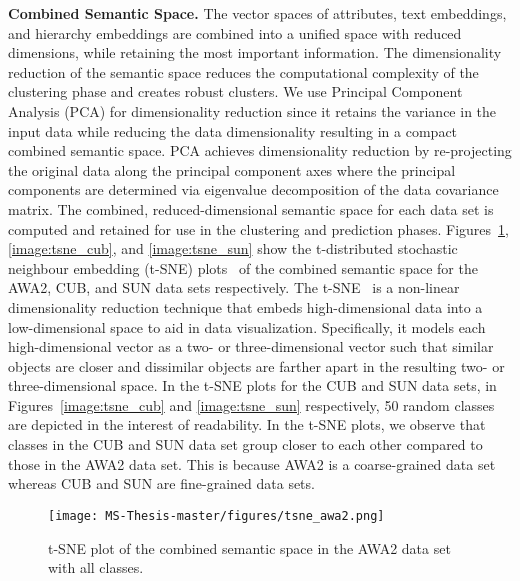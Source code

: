 \textbf{Combined Semantic Space.} The vector spaces of attributes, text embeddings, and hierarchy embeddings are combined into a unified space with reduced dimensions, while retaining the most important information. The dimensionality reduction of the semantic space reduces the computational complexity of the clustering phase and creates robust clusters. We use Principal Component Analysis (PCA) for dimensionality reduction since it retains the variance in the input data while reducing the data dimensionality resulting in a compact combined semantic space. PCA achieves dimensionality reduction by re-projecting the original data along the principal component axes where the principal components are determined via eigenvalue decomposition of the data covariance matrix. The combined, reduced-dimensional semantic space for each data set is computed and retained for use in the clustering and prediction phases. Figures~\ref{image:tsne_awa2}, \ref{image:tsne_cub}, and \ref{image:tsne_sun} show the t-distributed stochastic neighbour embedding (t-SNE) plots~\cite{t-sne} of the combined semantic space for the AWA2, CUB, and SUN data sets respectively. The t-SNE~\cite{t-sne} is a non-linear dimensionality reduction technique that embeds high-dimensional data into a low-dimensional space to aid in data visualization. Specifically, it models each high-dimensional vector as a two- or three-dimensional vector such that similar objects are closer and dissimilar objects are farther apart in the resulting two- or three-dimensional space. In the t-SNE plots for the CUB and SUN data sets, in Figures~\ref{image:tsne_cub} and \ref{image:tsne_sun} respectively, 50 random classes are depicted in the interest of readability. In the t-SNE plots, we observe that classes in the CUB and SUN data set group closer to each other compared to those in the AWA2 data set. This is because AWA2 is a coarse-grained data set whereas CUB and SUN are fine-grained data sets.

\par
\medskip

\begin{figure}[h!]
\texttt{[image: MS-Thesis-master/figures/tsne\_awa2.png]}
\caption{t-SNE plot of the combined semantic space in the AWA2 data set with all classes.}
\label{image:tsne_awa2}
\end{figure}

\par
\medskip

